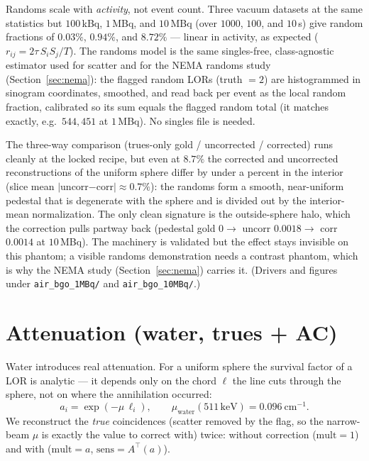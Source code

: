 \documentclass[11pt]{article}
\newcommand{\code}[1]{\texttt{#1}}
\begin{document}
Randoms scale with \emph{activity}, not event count. Three vacuum datasets at the
same statistics but $100$\,kBq, $1$\,MBq, and $10$\,MBq (over $1000$, $100$, and
$10$\,s) give random fractions of $0.03\%$, $0.94\%$, and $8.72\%$ --- linear in
activity, as expected ($r_{ij}=2\tau\,S_i S_j/T$). The randoms model is the same
singles-free, class-agnostic estimator used for scatter and for the NEMA randoms
study (Section~\ref{sec:nema}): the flagged random LORs (truth $=2$) are histogrammed
in sinogram coordinates, smoothed, and read back per event as the local random
fraction, calibrated so its sum equals the flagged random total (it matches exactly,
e.g.\ $544{,}451$ at $1$\,MBq). No singles file is needed.

The three-way comparison (trues-only gold / uncorrected / corrected) runs cleanly
at the locked recipe, but even at $8.7\%$ the corrected and uncorrected
reconstructions of the uniform sphere differ by under a percent in the interior
(slice mean $|$uncorr$-$corr$|\approx 0.7\%$): the randoms form a smooth, near-uniform
pedestal that is degenerate with the sphere and is divided out by the interior-mean
normalization. The only clean signature is the outside-sphere halo, which the
correction pulls partway back (pedestal gold $0\to$ uncorr $0.0018\to$ corr $0.0014$
at $10$\,MBq). The machinery is validated but the effect stays invisible on this
phantom; a visible randoms demonstration needs a contrast phantom, which is why the
NEMA study (Section~\ref{sec:nema}) carries it. (Drivers and figures under
\code{air\_bgo\_1MBq/} and \code{air\_bgo\_10MBq/}.)

\section{Attenuation (water, trues + AC)}

Water introduces real attenuation. For a uniform sphere the survival factor of a
LOR is analytic --- it depends only on the chord $\ell$ the line cuts through the
sphere, not on where the annihilation occurred:
\begin{equation}
  a_i = \exp(-\mu\,\ell_i), \qquad \mu_{\text{water}}(511\,\text{keV}) = 0.096~\text{cm}^{-1}.
\end{equation}
We reconstruct the \emph{true} coincidences (scatter removed by the flag, so the
narrow-beam $\mu$ is exactly the value to correct with) twice: without correction
($\text{mult}=1$) and with ($\text{mult}=a$, $\text{sens}=A^{\!\top}(a)$).
\end{document}
